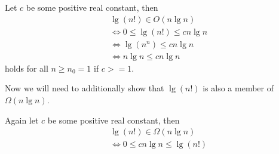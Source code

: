 \documentclass[11pt]{article}
\numberwithin{equation}{section}
\renewcommand{\iff}{\Leftrightarrow}
\begin{document}
Let $c$ be some positive real constant, then
\[
\begin{split}
    & \lg(n!) \in O(n \lg n) \\
    & \iff 0 \leq \lg(n!) \leq c n \lg n \\
    & \iff \lg (n^n) \leq c n \lg n \\
    & \iff n \lg n \leq c n \lg n
\end{split}
\]
holds for all $n \geq n_0 = 1$ if $c >= 1$.

Now we will need to additionally show that $\lg(n!)$ is also
a member of $\Omega(n \lg n)$.

Again let $c$ be some positive real constant, then
\[
\begin{split}
    & \lg(n!) \in \Omega(n \lg n) \\
    & \iff 0 \leq c n \lg n \leq \lg(n!) \\
\end{split}
\]
\end{document}
